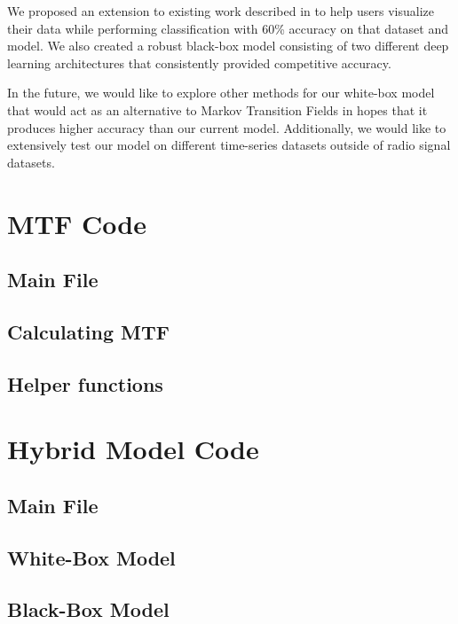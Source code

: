 \documentclass{turabian-thesis}
\begin{document}
We proposed an extension to existing work described in \cite{wang_encoding_nodate} to help users visualize their data while performing classification  with 60\% accuracy on that dataset and model. We also created a robust black-box model consisting of two different deep learning architectures that consistently provided competitive accuracy.

In the future, we would like to explore other methods for our white-box model that would act as an alternative to Markov Transition Fields in hopes that it produces higher accuracy than our current model. Additionally, we would like to extensively test our model on different time-series datasets outside of radio signal datasets.

\begin{appendices}
   \chapter{MTF Code}
      \section{Main File}
         
      \section{Calculating MTF}
         
      \section{Helper functions}
         
   \chapter{Hybrid Model Code}
      \section{Main File}
         
      \section{White-Box Model}
         
      \section{Black-Box Model}
         





\end{appendices}



 
\end{document}

